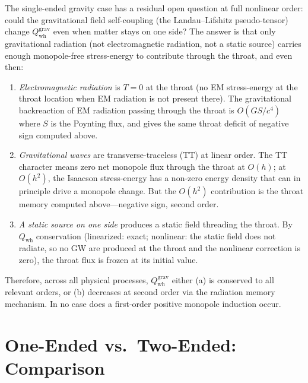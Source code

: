\documentclass[aps,prd,onecolumn,nofootinbib,superscriptaddress]{revtex4-2}
\begin{document}
The single-ended gravity case has a residual open question at full nonlinear
order: could the gravitational field self-coupling (the Landau--Lifshitz
pseudo-tensor) change $Q_{\mathrm{wh}}^{\mathrm{grav}}$ even when matter stays
on one side?  The answer is that only gravitational radiation (not
electromagnetic radiation, not a static source) carries enough monopole-free
stress-energy to contribute through the throat, and even then:

\begin{enumerate}
  \item \emph{Electromagnetic radiation} is $T=0$ at the throat (no EM
    stress-energy at the throat location when EM radiation is not present
    there).  The gravitational backreaction of EM radiation passing through the
    throat is $O(G S/c^4)$ where $S$ is the Poynting flux, and gives the same
    throat deficit of negative sign computed above.

  \item \emph{Gravitational waves} are transverse-traceless (TT) at linear
    order.  The TT character means zero net monopole flux through the throat at
    $O(h)$; at $O(h^2)$, the Isaacson stress-energy has a non-zero
    energy density that can in principle drive a monopole change.  But the
    $O(h^2)$ contribution is the throat memory computed above---negative sign,
    second order.

  \item \emph{A static source on one side} produces a static field threading
    the throat.  By $Q_{\mathrm{wh}}$ conservation (linearized: exact;
    nonlinear: the static field does not radiate, so no GW are produced at the
    throat and the nonlinear correction is zero), the throat flux is frozen at
    its initial value.
\end{enumerate}

Therefore, across all physical processes, $Q_{\mathrm{wh}}^{\mathrm{grav}}$ either
(a) is conserved to all relevant orders, or (b) decreases at second order via
the radiation memory mechanism.  In no case does a first-order positive
monopole induction occur.

\section{One-Ended vs.\ Two-Ended: Comparison}
\label{sec:topology-comparison}
\end{document}
